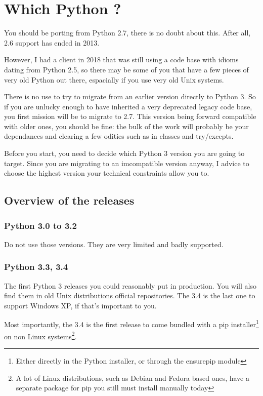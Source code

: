 \chapter{Which Python ?}

You should be porting from Python 2.7, there is no doubt about this. After all, 2.6 support has ended in 2013.

However, I had a client in 2018 that was still using a code base with idioms dating from Python 2.5, so there may be some of you that have a few pieces of very old Python out there, espacially if you use very old Unix systems.

There is no use to try to migrate from an earlier version directly to Python 3. So if you are unlucky enough to have inherited a very deprecated legacy code base, you first mission will be to migrate to 2.7. This version being forward compatible with older ones, you should be fine: the bulk of the work will probably be your dependances and clearing a few odities such as in classes and try/excepts.

Before you start, you need to decide which Python 3 version you are going to target. Since you are migrating to an imcompatible version anyway, I advice to choose the highest version your technical constraints allow you to.

\section{Overview of the releases}

\subsection{Python 3.0 to 3.2}

Do not use those versions. They are very limited and badly supported.

\subsection{Python 3.3, 3.4}

The first Python 3 releases you could reasonably put in production. You will also find them in old Unix distributions official repositories. The 3.4 is the last one to support Windows XP, if that's important to you.

Most importantly, the 3.4 is the first release to come bundled with a pip installer\footnote{Either directly in the Python installer, or through the ensurepip module} on non Linux systems\footnote{A lot of Linux distributions, such as Debian and Fedora based ones, have a separate package for pip you still must install manually today}.


